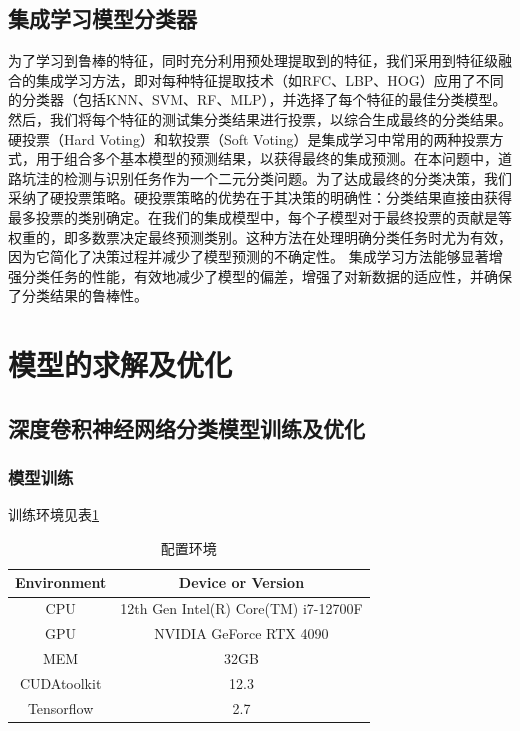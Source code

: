 \documentclass[a4paper, 10pt]{article}
\begin{document}
	
	\subsection{集成学习模型分类器}
	
	为了学习到鲁棒的特征，同时充分利用预处理提取到的特征，我们采用到特征级融合的集成学习方法，即对每种特征提取技术（如RFC、LBP、HOG）应用了不同的分类器（包括KNN、SVM、RF、MLP），并选择了每个特征的最佳分类模型。然后，我们将每个特征的测试集分类结果进行投票，以综合生成最终的分类结果。
	硬投票（Hard Voting）和软投票（Soft Voting）是集成学习中常用的两种投票方式，用于组合多个基本模型的预测结果，以获得最终的集成预测。在本问题中，道路坑洼的检测与识别任务作为一个二元分类问题。为了达成最终的分类决策，我们采纳了硬投票策略。硬投票策略的优势在于其决策的明确性：分类结果直接由获得最多投票的类别确定。在我们的集成模型中，每个子模型对于最终投票的贡献是等权重的，即多数票决定最终预测类别。这种方法在处理明确分类任务时尤为有效，因为它简化了决策过程并减少了模型预测的不确定性。
	集成学习方法能够显著增强分类任务的性能，有效地减少了模型的偏差，增强了对新数据的适应性，并确保了分类结果的鲁棒性。
	
	
	\section{模型的求解及优化}
	
	\subsection{深度卷积神经网络分类模型训练及优化}
	
	\subsubsection{模型训练}
	
	训练环境见表\ref{tab: Environment}
	
	\begin{table}[!htbp]
		\centering
		\tiny
			\begin{tabular}{cc}
				
				\toprule
				
				\textbf{Environment} & \textbf{Device or Version} \\
				
				\hline
				
				CPU & 12th Gen Intel(R) Core(TM) i7-12700F \\
				GPU & NVIDIA GeForce RTX 4090 \\
				MEM & 32GB \\
				CUDAtoolkit & 12.3 \\
				Tensorflow & 2.7 \\
				
				\bottomrule
				
			\end{tabular}
		\caption{\label{tab: Environment}
			配置环境} %
	\end{table}
	
\end{document}
